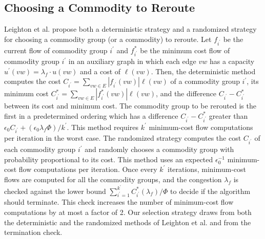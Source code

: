 \subsection{Choosing a Commodity to Reroute}
Leighton et al. propose both a deterministic strategy and a randomized
strategy for choosing a commodity group (or a commodity) to reroute.
Let $f_{i^\prime}$ be the current flow of commodity group $i^\prime$ and
$f_{i^\prime}^*$ be the minimum cost flow of commodity group $i^\prime$
in an auxiliary graph in which each edge $vw$ has a capacity
$u^{\prime}(vw) = \lambda _f \cdot u(vw)$ and a cost of $\ell (vw)$.
Then, the deterministic method computes the cost 
$C_{i^\prime} = \sum _{vw \in E} |f_{i^\prime}(vw)| \ell (vw)$
of a commodity group $i^\prime$, its minimum cost
$C_{i^\prime}^* = \sum _{vw \in E} |f_{i^\prime}^* (vw)| \ell (vw)$,
and the difference $C_{i^\prime} - C_{i^\prime}^*$ between its
cost and minimum cost.
The commodity group to be rerouted is the first in a predetermined
ordering which has a difference $C_{i^\prime} - C_{i^\prime}^*$ greater than
$\epsilon_0 C_{i^\prime} + (\epsilon_0 \lambda_f \Phi) / k^\prime$.
This method requires $k^\prime$ minimum-cost flow computations 
per iteration in the worst case.
The randomized strategy computes the cost $C_{i^\prime}$
of each commodity group $i^\prime$ and randomly chooses a commodity group
with probability proportional to its cost.  
This method uses an expected $\epsilon_0^{-1}$
minimum-cost flow computations per iteration.
Once every $k^\prime$ iterations, minimum-cost flows are computed for all
the commodity groups, and the congestion $\lambda_f$ is checked
against the lower bound 
$\sum_{i^\prime = 1}^{k^\prime} C_{i^\prime}^*(\lambda_f) / \Phi$ 
to decide if the algorithm should terminate.
This check increases the number of minimum-cost flow computations by
at most a factor of 2.
Our selection strategy draws from both the deterministic and the randomized
methods of Leighton et al. and from the termination check.

